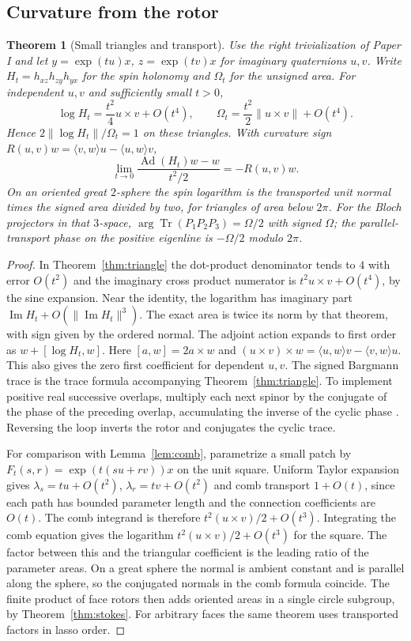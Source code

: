 \documentclass[11pt,reqno]{amsart}
\newtheorem{theorem}{Theorem}[section]
\theoremstyle{definition}
\theoremstyle{remark}
\numberwithin{equation}{section}
\begin{document}
\subsection{Curvature from the rotor}

\begin{theorem}[Small triangles and transport]\label{m8:rotor}
Use the right trivialization of Paper I and let
$y=\exp(tu)x$, $z=\exp(tv)x$ for imaginary quaternions $u,v$.
Write $H_t=h_{xz}h_{zy}h_{yx}$ for the spin holonomy and
$\Omega_t$ for the unsigned area. For independent $u,v$ and sufficiently
small $t>0$,
\[
 \log H_t=\frac{t^2}{4}u\times v+O(t^4),\qquad
 \Omega_t=\frac{t^2}{2}\|u\times v\|+O(t^4).
\]
Hence $2\|\log H_t\|/\Omega_t=1$ on these triangles.
With curvature sign $R(u,v)w=\langle v,w\rangle u-\langle u,w\rangle v$,
\[
 \lim_{t\to0}\frac{\operatorname{Ad}(H_t)w-w}{t^2/2}
 =-R(u,v)w .
\]
On an oriented great $2$-sphere the spin logarithm is the transported
unit normal times the signed area divided by two, for triangles of
area below $2\pi$. For the Bloch projectors in that $3$-space,
$\arg\operatorname{Tr}(P_1P_2P_3)=\Omega/2$ with signed $\Omega$;
the parallel-transport phase on the positive eigenline is
$-\Omega/2$ modulo $2\pi$.
\end{theorem}
\begin{proof}
In Theorem~\ref{thm:triangle} the dot-product denominator tends to
$4$ with error $O(t^2)$ and the imaginary cross product numerator is
$t^2 u\times v+O(t^4)$, by the sine expansion. Near the identity,
the logarithm has imaginary part $\operatorname{Im}H_t+
O(\|\operatorname{Im}H_t\|^3)$. The exact area is twice its norm by
that theorem, with sign given by the ordered normal. The adjoint
action expands to first order as $w+[\log H_t,w]$. Here
$[a,w]=2a\times w$ and
$(u\times v)\times w=\langle u,w\rangle v-\langle v,w\rangle u$.
This also gives the zero first coefficient for dependent $u,v$.
The signed Bargmann trace is the trace formula accompanying
Theorem~\ref{thm:triangle}. To implement positive real successive
overlaps, multiply each next spinor by the conjugate of the phase of
the preceding overlap, accumulating the inverse of the cyclic phase
\cite{SB88,MS93,m8:berry}. Reversing the loop inverts the rotor and
conjugates the cyclic trace.

For comparison with Lemma~\ref{lem:comb}, parametrize a small patch by
$F_t(s,r)=\exp(t(su+rv))x$ on the unit square. Uniform Taylor expansion
gives $\lambda_s=tu+O(t^2)$, $\lambda_r=tv+O(t^2)$ and comb transport
$1+O(t)$, since each path has bounded parameter length and the
connection coefficients are $O(t)$. The comb integrand is therefore
$t^2(u\times v)/2+O(t^3)$. Integrating the comb equation gives the
logarithm $t^2(u\times v)/2+O(t^3)$ for the square. The factor between
this and the triangular coefficient is the leading ratio of the
parameter areas. On a great sphere the normal is ambient constant
and is parallel along the sphere, so the conjugated normals in the
comb formula coincide. The finite product of face rotors then adds
oriented areas in a single circle subgroup, by Theorem~\ref{thm:stokes}.
For arbitrary faces the same theorem uses transported factors in
lasso order.
\end{proof}
\end{document}
